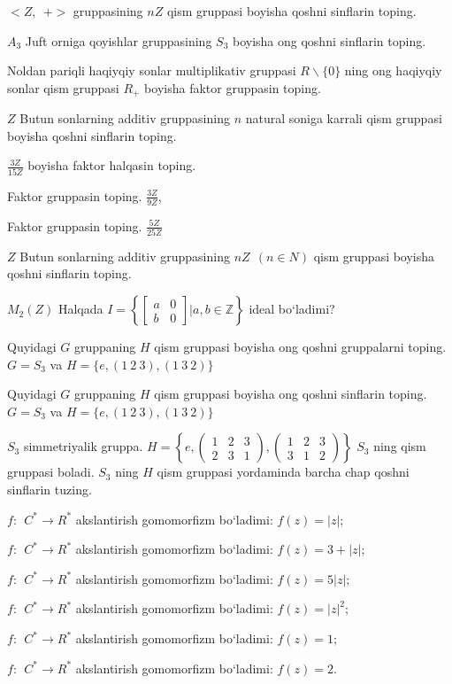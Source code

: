 \(< Z,\ \  + >\) gruppasining \(nZ\) qism gruppasi boyisha qo\textquotesingle shni sinflarin toping.

\(A_{3}\) Juft orniga qoyishlar gruppasining \(S_{3}\) boyisha o\textquotesingle ng qo\textquotesingle shni sinflarin toping.

Noldan pariqli haqiyqiy sonlar multiplikativ gruppasi \(R\backslash\{ 0\}\) ning o\textquotesingle ng haqiyqiy sonlar qism gruppasi \(R_{+}\) boyisha faktor gruppasin toping.

\(Z\) Butun sonlarning additiv gruppasining \(n\) natural soniga karrali qism gruppasi boyisha qo\textquotesingle shni sinflarin toping.

\(\frac{3Z}{15Z}\) boyisha faktor halqasin toping.

Faktor gruppasin toping. \(\frac{3Z}{9Z}\),

Faktor gruppasin toping. \(\frac{5Z}{25Z}\)

\(Z\) Butun sonlarning additiv gruppasining \(nZ\ \ (n \in N)\) qism gruppasi boyisha qo\textquotesingle shni sinflarin toping.

\(M_{2}(Z)\) Halqada \(I = \left\{ \begin{bmatrix}
a & 0 \\
b & 0
\end{bmatrix}|a,b\mathbb{\in Z} \right\}\) ideal bo`ladimi?

Quyidagi \(G\) gruppaning \(H\) qism gruppasi boyisha o\textquotesingle ng qo\textquotesingle shni gruppalarni toping. \(G = S_{3}\) va \(H = \{ e,(1\ 2\ 3),(1\ 3\ 2)\}\)

Quyidagi \(G\) gruppaning \(H\) qism gruppasi boyisha o\textquotesingle ng qo\textquotesingle shni sinflarin toping. \(G = S_{3}\) va \(H = \{ e,(1\ 2\ 3),(1\ 3\ 2)\}\)

\(S_{3}\) simmetriyalik gruppa. \(H = \left\{ e,\begin{pmatrix}
1 & 2 & 3 \\
2 & 3 & 1
\end{pmatrix},\begin{pmatrix}
1 & 2 & 3 \\
3 & 1 & 2
\end{pmatrix} \right\}\) \(S_{3}\) ning qism gruppasi bola\textquotesingle di. \(S_{3}\) ning \(H\) qism gruppasi yordaminda barcha chap qo\textquotesingle shni sinflarin tuzing.

\(f:\ \ C^{*} \rightarrow R^{*}\) akslantirish gomomorfizm bo`ladimi: \(f(z) = |z|;\)

\(f:\ \ C^{*} \rightarrow R^{*}\) akslantirish gomomorfizm bo`ladimi: \(f(z) = 3 + |z|;\)

\(f:\ \ C^{*} \rightarrow R^{*}\) akslantirish gomomorfizm bo`ladimi: \(f(z) = 5|z|;\)

\(f:\ \ C^{*} \rightarrow R^{*}\) akslantirish gomomorfizm bo`ladimi: \(f(z) = |z|^{2};\)

\(f:\ \ C^{*} \rightarrow R^{*}\) akslantirish gomomorfizm bo`ladimi: \(f(z) = 1;\)

\(f:\ \ C^{*} \rightarrow R^{*}\) akslantirish gomomorfizm bo`ladimi: \(f(z) = 2.\)